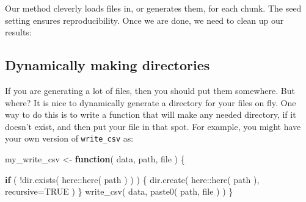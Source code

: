 \documentclass[
]{book}
\newenvironment{Shaded}{\begin{snugshade}}{\end{snugshade}}
\newcommand{\AttributeTok}[1]{\textcolor[rgb]{0.77,0.63,0.00}{#1}}
\newcommand{\CommentTok}[1]{\textcolor[rgb]{0.56,0.35,0.01}{\textit{#1}}}
\newcommand{\ConstantTok}[1]{\textcolor[rgb]{0.00,0.00,0.00}{#1}}
\newcommand{\ControlFlowTok}[1]{\textcolor[rgb]{0.13,0.29,0.53}{\textbf{#1}}}
\newcommand{\DecValTok}[1]{\textcolor[rgb]{0.00,0.00,0.81}{#1}}
\newcommand{\FunctionTok}[1]{\textcolor[rgb]{0.00,0.00,0.00}{#1}}
\newcommand{\NormalTok}[1]{#1}
\newcommand{\OtherTok}[1]{\textcolor[rgb]{0.56,0.35,0.01}{#1}}
\newcommand{\SpecialCharTok}[1]{\textcolor[rgb]{0.00,0.00,0.00}{#1}}
\newcommand{\StringTok}[1]{\textcolor[rgb]{0.31,0.60,0.02}{#1}}
\begin{document}
Our method cleverly loads files in, or generates them, for each chunk.
The seed setting ensures reproducibility.
Once we are done, we need to clean up our results:

\begin{Shaded}
\end{Shaded}

\hypertarget{dynamically-making-directories}{%
\subsection{Dynamically making directories}\label{dynamically-making-directories}}

If you are generating a lot of files, then you should put them somewhere.
But where?
It is nice to dynamically generate a directory for your files on fly.
One way to do this is to write a function that will make any needed directory, if it doesn't exist, and then put your file in that spot.
For example, you might have your own version of \texttt{write\_csv} as:

\begin{Shaded}
\begin{Highlighting}[]
\NormalTok{my\_write\_csv }\OtherTok{\textless{}{-}} \ControlFlowTok{function}\NormalTok{( data, path, file ) \{}
  
  \ControlFlowTok{if}\NormalTok{ ( }\SpecialCharTok{!}\FunctionTok{dir.exists}\NormalTok{( here}\SpecialCharTok{::}\FunctionTok{here}\NormalTok{( path ) ) ) \{}
    \FunctionTok{dir.create}\NormalTok{( here}\SpecialCharTok{::}\FunctionTok{here}\NormalTok{( path ), }\AttributeTok{recursive=}\ConstantTok{TRUE}\NormalTok{ ) }
\NormalTok{  \}}
  \FunctionTok{write\_csv}\NormalTok{( data, }\FunctionTok{paste0}\NormalTok{( path, file ) )}
\NormalTok{\}}
\end{Highlighting}
\end{Shaded}
\end{document}
